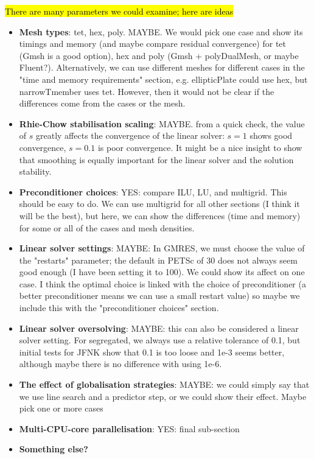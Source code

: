 \documentclass[sn-mathphys,Numbered]{sn-jnl}%
\begin{document}
\hl{There are many parameters we could examine; here are ideas}
\begin{itemize}
	\item \textbf{Mesh types}: tet, hex, poly. MAYBE. We would pick one case and show its timings and memory (and maybe compare residual convergence) for tet (Gmsh is a good option), hex and poly (Gmsh + polyDualMesh, or maybe Fluent?).
	 Alternatively, we can use different meshes for different cases in the "time and memory requirements" section, e.g. ellipticPlate could use hex, but narrowTmember uses tet. However, then it would not be clear if the differences come from the cases or the mesh.
	\item \textbf{Rhie-Chow stabilisation scaling}: MAYBE. from a quick check, the value of $s$ greatly affects the convergence of the linear solver: $s=1$ shows good convergence, $s=0.1$ is poor convergence. It might be a nice insight to show that smoothing is equally important for the linear solver and the solution stability.
	\item \textbf{Preconditioner choices}: YES: compare ILU, LU, and multigrid. This should be easy to do. We can use multigrid for all other sections (I think it will be the best), but here, we can show the differences (time and memory) for some or all of the cases and mesh densities.
	\item \textbf{Linear solver settings}: MAYBE: In GMRES, we must choose the value of the "restarts" parameter; the default in PETSc of 30 does not always seem good enough (I have been setting it to 100). We could show its affect on one case. I think the optimal choice is linked with the choice of preconditioner (a better preconditioner means we can use a small restart value) so maybe we include this with the "preconditioner choices" section.
	\item \textbf{Linear solver oversolving}: MAYBE: this can also be considered a linear solver setting. For segregated, we always use a relative tolerance of 0.1, but initial tests for JFNK show that 0.1 is too loose and 1e-3 seems better, although maybe there is no difference with using 1e-6.
	\item \textbf{The effect of globalisation strategies}: MAYBE: we could simply say that we use line search and a predictor step, or we could show their effect. Maybe pick one or more cases
	\item \textbf{Multi-CPU-core parallelisation}: YES: final sub-section
	\item \textbf{Something else?}
\end{itemize}
\end{document}
